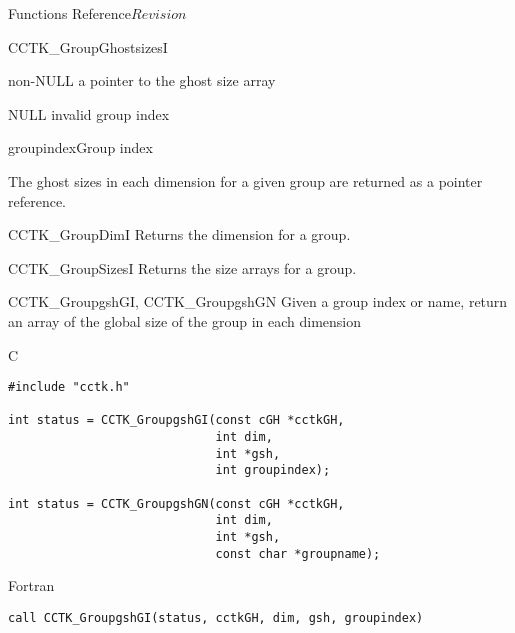 \begin{cactuspart}{ Functions Reference}{}{$Revision$}
\begin{FunctionDescription}{CCTK\_GroupGhostsizesI}
\begin{ResultSection}
\begin{Result}{non-NULL} a pointer to the ghost size array\end{Result}
\begin{Result}{NULL} invalid group index \end{Result}
\end{ResultSection}

\begin{ParameterSection}
\begin{Parameter}{groupindex}Group index\end{Parameter}
\end{ParameterSection}

\begin{Discussion}
The ghost sizes in each dimension for a given group are returned as a pointer reference.
\end{Discussion}

\begin{SeeAlsoSection}
\begin{SeeAlso}{CCTK\_GroupDimI}
Returns the dimension for a group.
\end{SeeAlso}
\begin{SeeAlso}{CCTK\_GroupSizesI}
Returns the size arrays for a group.
\end{SeeAlso}
\end{SeeAlsoSection}
\end{FunctionDescription}

\begin{FunctionDescription}{CCTK\_GroupgshGI, CCTK\_GroupgshGN}
\label{CCTK-GroupgshGI}
\label{CCTK-GroupgshGN}
Given a group index or name, return an array of the global size of the group in each dimension

\begin{SynopsisSection}
\begin{Synopsis}{C}
\begin{verbatim}
#include "cctk.h"

int status = CCTK_GroupgshGI(const cGH *cctkGH,
                             int dim,
                             int *gsh,
                             int groupindex);

int status = CCTK_GroupgshGN(const cGH *cctkGH,
                             int dim,
                             int *gsh,
                             const char *groupname);
\end{verbatim}
\end{Synopsis}
\begin{Synopsis}{Fortran}
\begin{verbatim}
call CCTK_GroupgshGI(status, cctkGH, dim, gsh, groupindex)


\end{verbatim}
\end{Synopsis}
\end{SynopsisSection}
\end{FunctionDescription}
\end{cactuspart}
